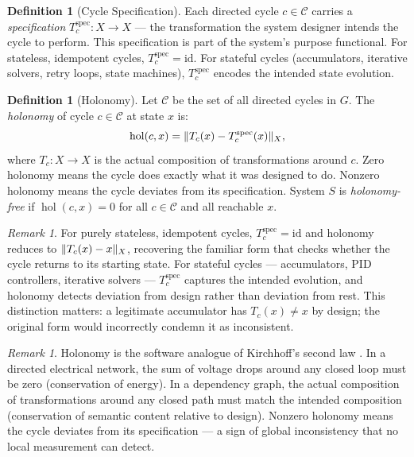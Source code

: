 \documentclass[twocolumn,a4paper,11pt]{article}
\theoremstyle{plain}
\theoremstyle{definition}
\newtheorem{definition}[theorem]{Definition}
\theoremstyle{remark}
\newtheorem{remark}[theorem]{Remark}
\DeclareMathOperator{\hol}{hol}
\DeclarePairedDelimiter{\norm}{\lVert}{\rVert}
\begin{document}
\begin{definition}[Cycle Specification]
\label{def:cycle-spec}
Each directed cycle $c \in \mathcal{C}$ carries a \emph{specification}
$T_c^{\mathrm{spec}}: X \to X$ --- the transformation the system designer
intends the cycle to perform. This specification is part of the system's
purpose functional. For stateless, idempotent cycles, $T_c^{\mathrm{spec}}
= \mathrm{id}$. For stateful cycles (accumulators, iterative solvers,
retry loops, state machines), $T_c^{\mathrm{spec}}$ encodes the intended
state evolution.
\end{definition}

\begin{definition}[Holonomy]
\label{def:holonomy}
Let $\mathcal{C}$ be the set of all directed cycles in $G$. The
\emph{holonomy} of cycle $c \in \mathcal{C}$ at state $x$ is:
\[
  \hol(c, x) = \norm{T_c(x) - T_c^{\mathrm{spec}}(x)}_{X},
\]
where $T_c: X \to X$ is the actual composition of transformations around
$c$. Zero holonomy means the cycle does exactly what it was designed to
do. Nonzero holonomy means the cycle deviates from its specification.
System $S$ is \emph{holonomy-free} if $\hol(c, x) = 0$ for all
$c \in \mathcal{C}$ and all reachable $x$.
\end{definition}

\begin{remark}
For purely stateless, idempotent cycles, $T_c^{\mathrm{spec}} = \mathrm{id}$
and holonomy reduces to $\norm{T_c(x) - x}_X$, recovering the familiar
form that checks whether the cycle returns to its starting state. For
stateful cycles --- accumulators, PID controllers, iterative solvers ---
$T_c^{\mathrm{spec}}$ captures the intended evolution, and holonomy detects
deviation from design rather than deviation from rest. This distinction
matters: a legitimate accumulator has $T_c(x) \neq x$ by design; the
original form would incorrectly condemn it as inconsistent.
\end{remark}

\begin{remark}
Holonomy is the software analogue of Kirchhoff's second law
\cite{kirchhoff1847}. In a directed electrical network, the sum of
voltage drops around any closed loop must be zero (conservation of
energy). In a dependency graph, the actual composition of transformations
around any closed path must match the intended composition (conservation
of semantic content relative to design). Nonzero holonomy means the cycle
deviates from its specification --- a sign of global inconsistency that no
local measurement can detect.
\end{remark}
\end{document}
